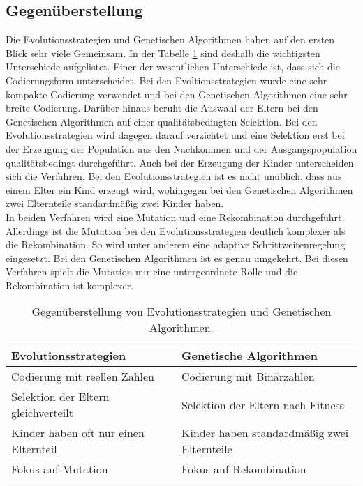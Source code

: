 \subsection{Gegenüberstellung}
Die Evolutionsstrategien und Genetischen Algorithmen haben auf den ersten Blick sehr viele Gemeinsam. In der Tabelle \ref{tab:kontra} sind deshalb die wichtigsten Unterschiede aufgelistet. 
Einer der wesentlichen Unterschiede ist, dass sich die Codierungsform unterscheidet. Bei den Evoltionsstrategien wurde eine sehr kompakte Codierung verwendet und bei den Genetischen Algorithmen eine sehr breite Codierung.
Darüber hinaus beruht die Auswahl der Eltern bei den Genetischen Algorithmen auf einer qualitätsbedingten Selektion. Bei den Evolutionsstrategien wird dagegen darauf verzichtet und eine Selektion erst bei der Erzeugung der Population aus den Nachkommen und der Ausgangspopulation qualitätsbedingt durchgeführt.
Auch bei der Erzeugung der Kinder unterscheiden sich die Verfahren. Bei den Evolutionsstrategien ist es nicht unüblich, dass aus einem Elter ein Kind erzeugt wird, wohingegen bei den Genetischen Algorithmen zwei Elternteile standardmäßig zwei Kinder haben.\\
In beiden Verfahren wird eine Mutation und eine Rekombination durchgeführt. Allerdings ist die Mutation bei den Evolutionsstrategien deutlich komplexer als die Rekombination. So wird unter anderem eine adaptive Schrittweitenregelung eingesetzt. Bei den Genetischen Algorithmen ist es genau umgekehrt. Bei diesen Verfahren spielt die Mutation nur eine untergeordnete Rolle und die Rekombination ist komplexer.
\begin{table}[!htb]
\centering
\begin{tabular}[h]{l|l}
Evolutionsstrategien & Genetische Algorithmen \\
\hline
Codierung mit reellen Zahlen & Codierung mit Binärzahlen \\
Selektion der Eltern gleichverteilt & Selektion der Eltern nach Fitness \\
Kinder haben oft nur einen Elternteil & Kinder haben standardmäßig zwei Elternteile \\
Fokus auf Mutation & Fokus auf Rekombination \\
\end{tabular}
\caption{\label{tab:kontra}Gegenüberstellung von Evolutionsstrategien und Genetischen Algorithmen.}
\end{table}
